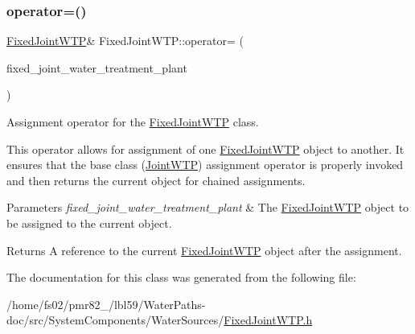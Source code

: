 \subsubsection{\texorpdfstring{operator=()}{operator=()}}
{\footnotesize\ttfamily \mbox{\hyperlink{classFixedJointWTP}{Fixed\+Joint\+W\+TP}}\& Fixed\+Joint\+W\+T\+P\+::operator= (\begin{DoxyParamCaption}\item[{const \mbox{\hyperlink{classFixedJointWTP}{Fixed\+Joint\+W\+TP}} \&}]{fixed\+\_\+joint\+\_\+water\+\_\+treatment\+\_\+plant }\end{DoxyParamCaption})}



Assignment operator for the \mbox{\hyperlink{classFixedJointWTP}{Fixed\+Joint\+W\+TP}} class. 

This operator allows for assignment of one {\ttfamily \mbox{\hyperlink{classFixedJointWTP}{Fixed\+Joint\+W\+TP}}} object to another. It ensures that the base class ({\ttfamily \mbox{\hyperlink{classJointWTP}{Joint\+W\+TP}}}) assignment operator is properly invoked and then returns the current object for chained assignments.


\begin{DoxyParams}{Parameters}
{\em fixed\+\_\+joint\+\_\+water\+\_\+treatment\+\_\+plant} & The {\ttfamily \mbox{\hyperlink{classFixedJointWTP}{Fixed\+Joint\+W\+TP}}} object to be assigned to the current object.\\
\hline
\end{DoxyParams}
\begin{DoxyReturn}{Returns}
A reference to the current {\ttfamily \mbox{\hyperlink{classFixedJointWTP}{Fixed\+Joint\+W\+TP}}} object after the assignment. 
\end{DoxyReturn}


The documentation for this class was generated from the following file\+:\begin{DoxyCompactItemize}
\item 
/home/fs02/pmr82\+\_/lbl59/\+Water\+Paths-\/doc/src/\+System\+Components/\+Water\+Sources/\mbox{\hyperlink{FixedJointWTP_8h}{Fixed\+Joint\+W\+T\+P.\+h}}\end{DoxyCompactItemize}
